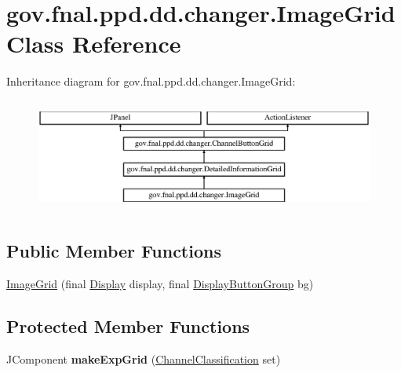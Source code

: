 \hypertarget{classgov_1_1fnal_1_1ppd_1_1dd_1_1changer_1_1ImageGrid}{\section{gov.\-fnal.\-ppd.\-dd.\-changer.\-Image\-Grid Class Reference}
\label{classgov_1_1fnal_1_1ppd_1_1dd_1_1changer_1_1ImageGrid}
}
Inheritance diagram for gov.\-fnal.\-ppd.\-dd.\-changer.\-Image\-Grid\-:\begin{figure}[H]
\begin{center}
\leavevmode
\includegraphics[height=3.783784cm]{classgov_1_1fnal_1_1ppd_1_1dd_1_1changer_1_1ImageGrid}
\end{center}
\end{figure}
\subsection*{Public Member Functions}
\begin{DoxyCompactItemize}
\item 
\hyperlink{classgov_1_1fnal_1_1ppd_1_1dd_1_1changer_1_1ImageGrid_a34570a94e8247dd356c8212d43979788}{Image\-Grid} (final \hyperlink{interfacegov_1_1fnal_1_1ppd_1_1dd_1_1signage_1_1Display}{Display} display, final \hyperlink{classgov_1_1fnal_1_1ppd_1_1dd_1_1util_1_1DisplayButtonGroup}{Display\-Button\-Group} bg)
\end{DoxyCompactItemize}
\subsection*{Protected Member Functions}
\begin{DoxyCompactItemize}
\item 
\hypertarget{classgov_1_1fnal_1_1ppd_1_1dd_1_1changer_1_1ImageGrid_abc159f4865dd5542cfa75bdbbda1bd30}{J\-Component {\bfseries make\-Exp\-Grid} (\hyperlink{classgov_1_1fnal_1_1ppd_1_1dd_1_1changer_1_1ChannelClassification}{Channel\-Classification} set)}\label{classgov_1_1fnal_1_1ppd_1_1dd_1_1changer_1_1ImageGrid_abc159f4865dd5542cfa75bdbbda1bd30}

\end{DoxyCompactItemize}

